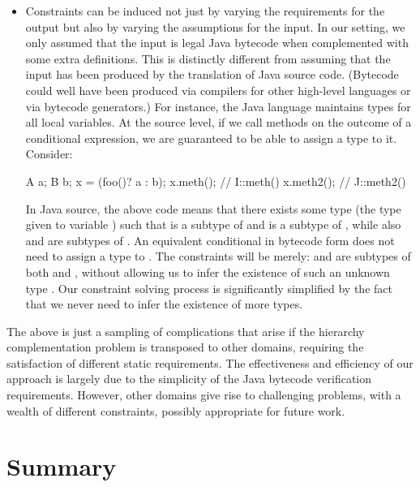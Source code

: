 \begin{itemize}[--]
\item Constraints can be induced not just by varying the requirements
  for the output but also by varying the assumptions for the input.
  In our setting, we only assumed that the input is legal Java
  bytecode when complemented with some extra definitions. This is
  distinctly different from assuming that the input has been produced
  by the translation of Java source code. (Bytecode could well have
  been produced via compilers for other high-level languages or via
  bytecode generators.) For instance, the Java language maintains
  types for all local variables. At the source level, if we call
  methods on the outcome of a conditional expression, we are
  guaranteed to be able to assign a type to it. Consider:

  \begin{javacode}
    A a;
    B b;
    x = (foo()? a : b);
    x.meth();  // I::meth()
    x.meth2(); // J::meth2()
  \end{javacode}

  In Java source, the above code means that there exists some type
   (the type given to variable ) such that  is
  a subtype of  and  is a subtype of , while
  also  and  are subtypes of . An equivalent
  conditional in bytecode form does not need to assign a type to
  . The constraints will be merely:  and  are
  subtypes of both  and , without allowing us to infer
  the existence of such an unknown type . Our constraint
  solving process is significantly simplified by the fact that we
  never need to infer the existence of more types.

\end{itemize}

The above is just a sampling of complications that arise if the
hierarchy complementation problem is transposed to other domains,
requiring the satisfaction of different static requirements. The
effectiveness and efficiency of our approach is largely due to
the simplicity of the Java bytecode verification requirements.
However, other domains give rise to challenging problems,
with a wealth of different constraints, possibly appropriate for
future work.


\section{Summary}

